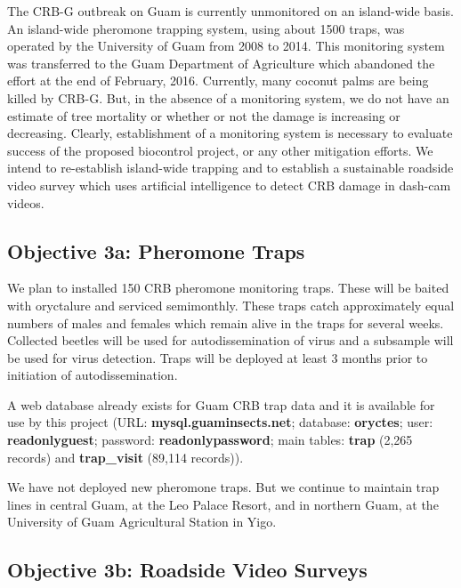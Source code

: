 \documentclass[12pt,letterpaper,english,bibliography=totocnumbered, abstract=on]{scrartcl}
\begin{document}
\begin{framed}
The CRB-G outbreak on Guam is currently unmonitored on an island-wide basis. An island-wide pheromone trapping system, using about 1500 traps, was operated by the University of Guam from 2008 to 2014. This monitoring system was transferred to the Guam Department of Agriculture which abandoned the effort at the end of February, 2016.  Currently, many coconut palms are being killed by CRB-G. But, in the absence of a monitoring system, we do not have an estimate of tree mortality or whether or not the damage is increasing or decreasing. Clearly, establishment of a monitoring system is necessary to evaluate success of the proposed biocontrol project, or any other mitigation efforts. We intend to re-establish island-wide trapping and to establish a sustainable roadside video survey which uses artificial intelligence to detect CRB damage in dash-cam videos. 
\end{framed}

\subsection{Objective 3a: Pheromone Traps}

\begin{framed}
We plan to installed 150 CRB pheromone monitoring traps. These will be baited with oryctalure and serviced semimonthly. These traps catch approximately equal numbers of males and females which remain alive in the traps for several weeks. Collected beetles will be used for autodissemination of virus and a subsample will be used for virus detection. Traps will be deployed at least 3 months prior to initiation of autodissemination.  

A web database already exists for Guam CRB trap data and it is available for use by this project (URL: \textbf{mysql.guaminsects.net}; database: \textbf{oryctes}; user: \textbf{readonlyguest}; password: \textbf{readonlypassword}; main tables: \textbf{trap} (2,265 records) and \textbf{trap\_visit} (89,114 records)).
\end{framed}

We have not deployed new pheromone traps. But we continue to maintain trap lines in central Guam, at the Leo Palace Resort, and in northern Guam, at the University of Guam Agricultural Station in Yigo.

\clearpage
\subsection{Objective 3b: Roadside Video Surveys}
\end{document}
